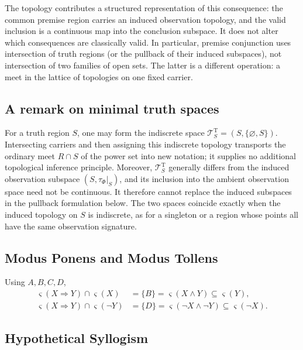 \documentclass[11pt]{article}
\theoremstyle{definition}
\theoremstyle{plain}
\theoremstyle{remark}
\newcommand{\True}{\mathrm{T}}
\newcommand{\restr}{\mathord{|}}
\begin{document}
The topology contributes a structured representation of this consequence: the
common premise region carries an induced observation topology, and the valid
inclusion is a continuous map into the conclusion subspace.  It does not alter
which consequences are classically valid.  In particular, premise conjunction
uses intersection of truth regions (or the pullback of their induced
subspaces), not intersection of two families of open sets.  The latter is a
different operation: a meet in the lattice of topologies on one fixed carrier.

\subsection{A remark on minimal truth spaces}

For a truth region $S$, one may form the indiscrete space
$\mathcal T^\True_S=(S,\{\varnothing,S\})$.  Intersecting carriers and then
assigning this indiscrete topology transports the ordinary meet
$R\cap S$ of the power set into new notation; it supplies no additional
topological inference principle.  Moreover, $\mathcal T^\True_S$ generally
differs from the induced observation subspace
$(S,\tau_\Phi\restr_S)$, and its inclusion into the ambient observation space
need not be continuous.  It therefore cannot replace the induced subspaces in
the pullback formulation below.  The two spaces coincide exactly when the
induced topology on $S$ is indiscrete, as for a singleton or a region whose
points all have the same observation signature.

\subsection{Modus Ponens and Modus Tollens}

Using $A,B,C,D$,
\begin{align*}
 \varsigma(X\Rightarrow Y)\cap\varsigma(X)
   &=\{B\}
    =\varsigma(X\wedge Y)
    \subseteq\varsigma(Y),\\
 \varsigma(X\Rightarrow Y)\cap\varsigma(\neg Y)
   &=\{D\}
    =\varsigma(\neg X\wedge\neg Y)
    \subseteq\varsigma(\neg X).
\end{align*}
\subsection{Hypothetical Syllogism}
\end{document}

